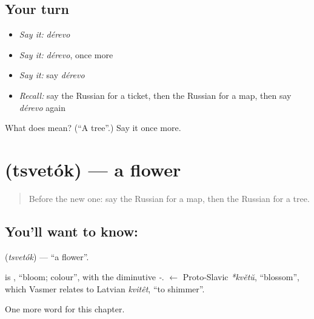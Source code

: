 \subsection*{Your turn}
\begin{itemize}
\raggedright
  \item \emph{Say it:} \emph{dérevo}
  \item \emph{Say it:} \emph{dérevo}, once more
  \item \emph{Say it:} say \emph{dérevo}
  \item \emph{Recall:} say the Russian for a ticket, then the Russian for a map, then say \emph{dérevo} again
\end{itemize}

\begin{tcolorbox}[breakable,colback=teal!4,colframe=teal!35!black,title={Before you move on}]
What does  mean? (\textquotedblleft{}A tree\textquotedblright{}.) Say it once more.
\end{tcolorbox}
\section[\texorpdfstring{\ru{цветок} (tsvetók)}{цветок (tsvetók)}]{ (tsvetók) — a flower}

\label{lesson:RU-C55-flower}



\begin{quote}
Before the new one: say the Russian for a map, then the Russian for a tree.
\end{quote}

\subsection*{You'll want to know: }
\textbf{} (\emph{tsvetók}) — \textquotedblleft{}a flower\textquotedblright{}.

\begin{cousinweb}
\textbf{} is \emph{}, \textquotedblleft{}bloom; colour\textquotedblright{}, with the diminutive \emph{-}. \emph{} $\leftarrow$ Proto-Slavic \emph{*květŭ}, \textquotedblleft{}blossom\textquotedblright{}, which Vasmer relates to Latvian \emph{kvitêt}, \textquotedblleft{}to shimmer\textquotedblright{}.
\end{cousinweb}

\begin{grammarlens}[title={What you've built}]
One more word for this chapter.
\end{grammarlens}

